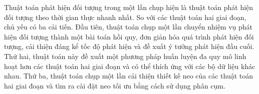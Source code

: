 \documentclass[../the.tex]{subfiles}
\begin{document}
{\fontsize{13}{12} \selectfont
	Thuật toán phát hiện đối tượng trong một lần chụp hiện là thuật toán phát hiện đối tượng theo thời gian thực nhanh nhất. So với các thuật toán hai giai đoạn, chủ yếu có ba cải tiến. Đầu tiên, thuật toán chụp một lần chuyển nhiệm vụ phát hiện đối tượng thành một bài toán hồi quy, đơn giản hóa quá trình phát hiện đối tượng, cải thiện đáng kể tốc độ phát hiện và đề xuất ý tưởng phát hiện đầu cuối. Thứ hai, thuật toán này đề xuất một phương pháp huấn luyện đa quy mô linh hoạt hơn các thuật toán hai giai đoạn và có thể thích ứng với các bộ dữ liệu khác nhau. Thứ ba, thuật toán chụp một lần cải thiện thiết kế neo của các thuật toán hai giai đoạn và tìm ra cài đặt neo tối ưu bằng cách sử dụng phân cụm.
}
\end{document}
